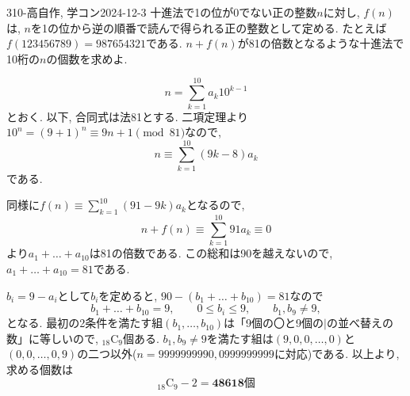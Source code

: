 \begin{thm}{310}{-高}{自作, 学コン2024-12-3}
十進法で1の位が0でない正の整数$n$に対し, $f(n)$は, $n$を1の位から逆の順番で読んで得られる正の整数として定める. たとえば$f(123456789) = 987654321$である. 
    $n+f(n)$が81の倍数となるような十進法で10桁の$n$の個数を求めよ. 
\end{thm}


\[n = \sum_{k=1}^{10} a_k 10^{k-1}\]
とおく. 以下, 合同式は法81とする. 二項定理より$10^n = (9 + 1)^n \equiv 9n + 1\pmod{81}$なので, 
\[
n\equiv \sum_{k=1}^{10}(9k-8)a_k
\]
である.





同様に$f(n) \equiv \sum_{k=1}^{10} (91-9k)a_k$となるので, 
\[
n + f(n) \equiv \sum_{k=1}^{10} 91 a_k \equiv 0
\]
より$a_1 + \dots + a_{10}$は81の倍数である. この総和は90を越えないので, $a_1 + \dots + a_{10} = 81$である. 

$b_i = 9-a_i$として$b_i$を定めると, $90 - (b_1 + \dots + b_{10}) = 81$なので 
\[
b_1 + \dots + b_{10} = 9,\qquad 0\leq b_i\leq 9,\qquad b_1,b_9\neq 9, 
\]
となる. 最初の2条件を満たす組$(b_1,\dots, b_{10})$は「9個の〇と9個の$|$の並べ替えの数」に等しいので, ${}_{18}\mathrm{C}_{9}$個ある. $b_1,b_9 \neq 9$を満たす組は$(9,0,0,\dots, 0)$と$(0,0,\dots,0,9)$の二つ以外($n = 9999999990, 0999999999$に対応)である. 以上より, 求める個数は
\[
{}_{18}\mathrm{C}_{9} - 2 = \boldsymbol{48618}\text{個}
\]

